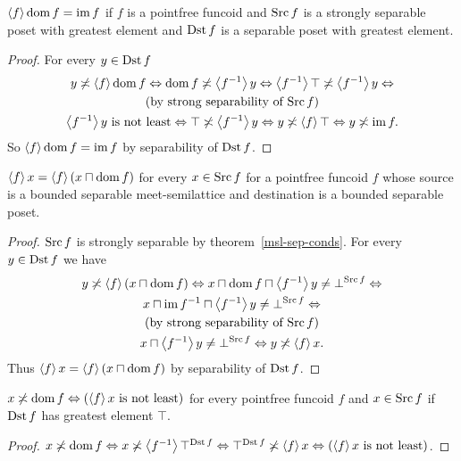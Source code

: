 \begin{prop}\label{f-dom-f}
$\left\langle f\right\rangle\operatorname{dom} f=\operatorname{im} f$ if $f$ is a pointfree funcoid and
$\operatorname{Src} f$ is a strongly separable poset with greatest element
and $\operatorname{Dst} f$ is a separable poset with greatest element.\end{prop}
\begin{proof}
For every $y\in\operatorname{Dst} f$
\begin{multline*}
y\not\asymp\left\langle f\right\rangle\operatorname{dom} f\Leftrightarrow\operatorname{dom} f\not\asymp\left\langle f^{-1}\right\rangle y\Leftrightarrow\left\langle f^{-1}\right\rangle\top\not\asymp\left\langle f^{-1}\right\rangle y\Leftrightarrow\\
\text{(by strong separability of $\operatorname{Src} f$)}\\
\left\langle f^{-1}\right\rangle y\text{ is not least}\Leftrightarrow\top\not\asymp\left\langle f^{-1}\right\rangle y\Leftrightarrow y\not\asymp\left\langle f\right\rangle\top\Leftrightarrow y\not\asymp\operatorname{im} f.
\end{multline*}
So $\left\langle f\right\rangle\operatorname{dom} f=\operatorname{im} f$ by separability of $\operatorname{Dst} f$.\end{proof}
\begin{prop}\label{pf-cap-dom}
$\left\langle f\right\rangle x=\left\langle f\right\rangle(x\sqcap\operatorname{dom} f)$
for every $x\in\operatorname{Src} f$ for a pointfree funcoid $f$ whose source
is a bounded separable meet-semilattice and destination is a bounded separable poset.\end{prop}
\begin{proof}
$\operatorname{Src} f$ is strongly separable by theorem~\ref{msl-sep-conds}.
For every $y\in\operatorname{Dst} f$ we have
\begin{multline*}
y\not\asymp\left\langle f\right\rangle(x\sqcap\operatorname{dom} f)\Leftrightarrow x\sqcap\operatorname{dom} f\sqcap\left\langle f^{-1}\right\rangle y\ne\bot^{\operatorname{Src} f}\Leftrightarrow\\
x\sqcap\operatorname{im} f^{-1}\sqcap\left\langle f^{-1}\right\rangle y\ne\bot^{\operatorname{Src} f}\Leftrightarrow\\
\text{(by strong separability of $\operatorname{Src} f$)}\\
x\sqcap\left\langle f^{-1}\right\rangle y\ne\bot^{\operatorname{Src} f}\Leftrightarrow y\not\asymp\left\langle f\right\rangle x.
\end{multline*}
Thus $\left\langle f\right\rangle x=\left\langle f\right\rangle(x\sqcap\operatorname{dom} f)$ by separability of $\operatorname{Dst} f$.\end{proof}
\begin{prop}
$x\not\asymp\operatorname{dom} f\Leftrightarrow(\left\langle f\right\rangle x\text{ is not least})$ for
every pointfree funcoid $f$ and $x\in\operatorname{Src} f$ if $\operatorname{Dst} f$ has greatest
element $\top$.\end{prop}
\begin{proof}
$x\not\asymp\operatorname{dom} f\Leftrightarrow x\not\asymp\left\langle f^{-1}\right\rangle\top^{\operatorname{Dst} f}\Leftrightarrow\top^{\operatorname{Dst} f}\not\asymp\left\langle f\right\rangle x\Leftrightarrow(\left\langle f\right\rangle x\text{ is not least})$.\end{proof}
